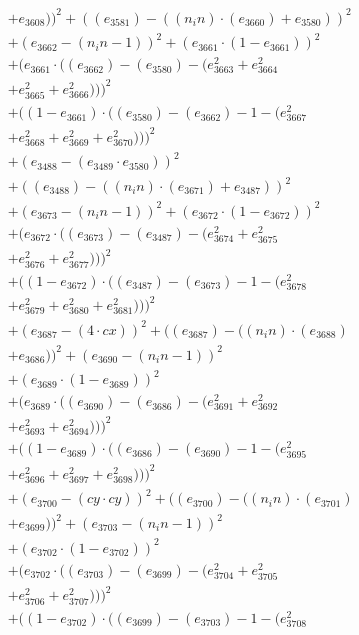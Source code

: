 \documentclass[10pt, a4paper]{article}
\begin{document}
\begin{align*}
& + e_{3608}))^{2} + ((e_{3581}) - ((n_in)  \cdot  (e_{3660}) + e_{3580}))^{2} \\
& + (e_{3662} - (n_in - 1))^{2} + (e_{3661}  \cdot  (1 - e_{3661}))^{2} \\
& + (e_{3661}  \cdot  ((e_{3662}) - (e_{3580}) - (e_{3663}^{2} + e_{3664}^{2} \\
& + e_{3665}^{2} + e_{3666}^{2})))^{2} \\
& + ((1 - e_{3661})  \cdot  ((e_{3580}) - (e_{3662}) - 1 - (e_{3667}^{2} \\
& + e_{3668}^{2} + e_{3669}^{2} + e_{3670}^{2})))^{2} \\
& + (e_{3488} - (e_{3489}  \cdot  e_{3580}))^{2} \\
& + ((e_{3488}) - ((n_in)  \cdot  (e_{3671}) + e_{3487}))^{2} \\
& + (e_{3673} - (n_in - 1))^{2} + (e_{3672}  \cdot  (1 - e_{3672}))^{2} \\
& + (e_{3672}  \cdot  ((e_{3673}) - (e_{3487}) - (e_{3674}^{2} + e_{3675}^{2} \\
& + e_{3676}^{2} + e_{3677}^{2})))^{2} \\
& + ((1 - e_{3672})  \cdot  ((e_{3487}) - (e_{3673}) - 1 - (e_{3678}^{2} \\
& + e_{3679}^{2} + e_{3680}^{2} + e_{3681}^{2})))^{2} \\
& + (e_{3687} - (4  \cdot  cx))^{2} + ((e_{3687}) - ((n_in)  \cdot  (e_{3688}) \\
& + e_{3686}))^{2} + (e_{3690} - (n_in - 1))^{2} \\
& + (e_{3689}  \cdot  (1 - e_{3689}))^{2} \\
& + (e_{3689}  \cdot  ((e_{3690}) - (e_{3686}) - (e_{3691}^{2} + e_{3692}^{2} \\
& + e_{3693}^{2} + e_{3694}^{2})))^{2} \\
& + ((1 - e_{3689})  \cdot  ((e_{3686}) - (e_{3690}) - 1 - (e_{3695}^{2} \\
& + e_{3696}^{2} + e_{3697}^{2} + e_{3698}^{2})))^{2} \\
& + (e_{3700} - (cy  \cdot  cy))^{2} + ((e_{3700}) - ((n_in)  \cdot  (e_{3701}) \\
& + e_{3699}))^{2} + (e_{3703} - (n_in - 1))^{2} \\
& + (e_{3702}  \cdot  (1 - e_{3702}))^{2} \\
& + (e_{3702}  \cdot  ((e_{3703}) - (e_{3699}) - (e_{3704}^{2} + e_{3705}^{2} \\
& + e_{3706}^{2} + e_{3707}^{2})))^{2} \\
& + ((1 - e_{3702})  \cdot  ((e_{3699}) - (e_{3703}) - 1 - (e_{3708}^{2} \\

\end{align*}
\end{document}
